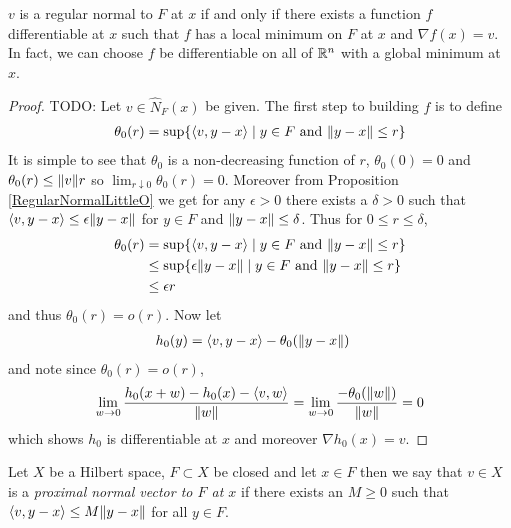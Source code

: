 \begin{thm}$v$ is a regular normal to $F$ at $x$ if and only if there exists a function $f$ differentiable at $x$ such that 
$f$ has a local minimum on $F$ at $x$ and $\nabla f (x) = v$.  In fact, we can choose $f$ be differentiable on all of $\mathbb{R}^n$ 
with a global minimum at $x$.
\end{thm}
\begin{proof}
TODO:  
Let $v \in \widehat{N}_F(x)$ be given.  The first step to building $f$ is to define
\begin{align*}
\theta_0(r) = \sup \lbrace \langle v, y - x \rangle \mid y \in F \text{ and } \lVert y-x \rVert \leq r \rbrace
\end{align*}
It is simple to see that $\theta_0$ is a non-decreasing function of $r$,  $\theta_0(0) = 0$ and
$\theta_0(r) \leq \lVert v \rVert r$ so $\lim_{r \downarrow 0} \theta_0(r) = 0$. 
Moreover from Proposition \ref{RegularNormalLittleO} we get for any $\epsilon > 0$ there exists a $\delta > 0$ such that
$\langle v, y-x \rangle \leq \epsilon \lVert y-x \rVert$ for $y \in F$ and $\lVert y-x \rVert \leq \delta$.    Thus for $0 \leq r \leq \delta$, 
\begin{align*}
\theta_0(r)&= \sup \lbrace \langle v, y - x \rangle \mid y \in F \text{ and } \lVert y-x \rVert \leq r \rbrace \\
&\leq \sup \lbrace \epsilon \lVert y-x \rVert \mid y \in F \text{ and } \lVert y-x \rVert \leq r \rbrace \\
&\leq \epsilon r \\
\end{align*}
and thus $\theta_0(r) = o(r)$.
Now let 
\begin{align*}
h_0(y) &= \langle v, y-x\rangle - \theta_0(\lVert y-x \rVert)
\end{align*}
and note since $\theta_0(r) = o(r)$,
\begin{align*}
\lim_{w \to 0} \frac{h_0(x+w) - h_0(x) - \langle v,w \rangle}{\lVert w \rVert} =\lim_{w \to 0} \frac{-\theta_0(\lVert w \rVert)}{\lVert w \rVert} =0\\
\end{align*}
which shows $h_0$ is differentiable at $x$ and moreover $\nabla h_0(x) = v$.
\end{proof}

\begin{defn}Let $X$ be a Hilbert space, $F \subset X$ be closed and let
  $x \in F$ then we say that $v \in X$ is a \emph{proximal normal
    vector to $F$ at $x$} if there exists an $M \geq 0$ such that
  $\langle v, y - x \rangle \leq M \lVert y - x \rVert$ for all $y \in F$.
\end{defn}

